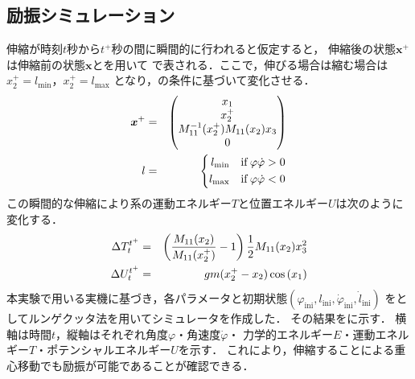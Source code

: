           \subsection{励振シミュレーション}
          伸縮が時刻$t$秒から$t^{+}$秒の間に瞬間的に行われると仮定すると，
          伸縮後の状態$\bm{x}^{+}$は伸縮前の状態$\bm{x}$とを用いて
          で表される．ここで，伸びる場合は縮む場合は$x_2^{+}=l_{\mathrm{min}}$，$x_2^{+}=l_{\mathrm{max}}$
          となり，の条件に基づいて変化させる．
          \begin{eqnarray}
            \equlabel{xx}
            \bm{x}^{+}&=&
            \begin{pmatrix}
                x_1\\
                x_2^{+}\\
                M_{11}^{-1}(x_2^{+})M_{11}(x_2)x_3\\
                0\\
                \end{pmatrix}\\
            \equlabel{l_change}
           l&=& \left\{
              \begin{aligned}
                l_{\mathrm{min}}\quad \mathrm{if}\,\varphi\dot{\varphi}>0\\
                l_{\mathrm{max}}\quad \mathrm{if}\,\varphi\dot{\varphi}<0
              \end{aligned}
            \right.
            \end{eqnarray}
          この瞬間的な伸縮により系の運動エネルギー$T$と位置エネルギー$U$は次のように変化する．
          \begin{eqnarray}
            \equlabel{dT}
            \Delta T_t^{t^{+}}&=&\left(\frac{M_{11}(x_2)}{M_{11}(x_2^{+})}-1\right)\frac{1}{2}M_{11}(x_2)x_3^2\\
            \equlabel{dU}
            \Delta U_t^{t^{+}}&=&gm(x_2^{+}-x_2)\cos{(x_1)}            
            \end{eqnarray}
          本実験で用いる実機に基づき，各パラメータと初期状態$(\varphi_{\mathrm{ini}},l_{\mathrm{ini}},\dot{\varphi}_{\mathrm{ini}},\dot{l}_{\mathrm{ini}})$
          をとしてルンゲクッタ法を用いてシミュレータを作成した．
          その結果をに示す．
          横軸は時間$t$，縦軸はそれぞれ角度$\varphi$・角速度$\dot{\varphi}$・
          力学的エネルギー$E$・運動エネルギー$T$・ポテンシャルエネルギー$U$を示す．
          これにより，伸縮することによる重心移動でも励振が可能であることが確認できる．
